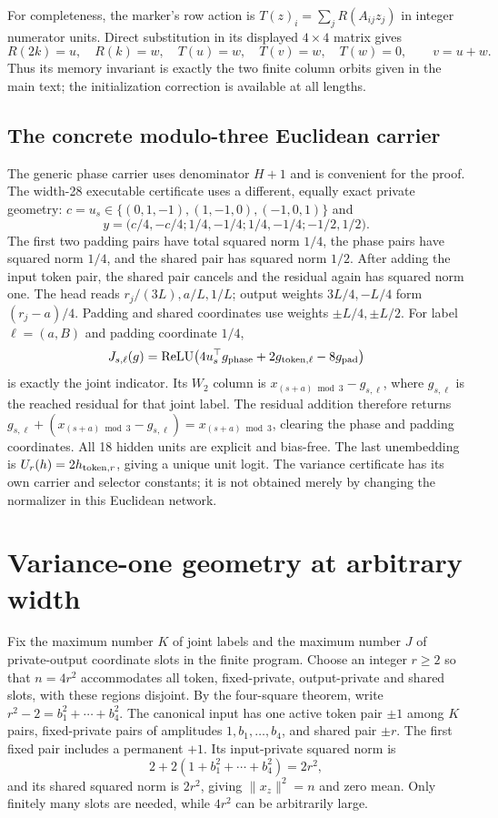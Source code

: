 \documentclass[10pt]{article}
\theoremstyle{remark}
\newcommand{\relu}{\operatorname{ReLU}}
\begin{document}
For completeness, the marker's row action is
$T(z)_i=\sum_jR(A_{ij}z_j)$ in integer numerator units. Direct substitution
in its displayed $4\times4$ matrix gives
\[
 R(2k)=u,\quad R(k)=w,\quad T(u)=w,\quad T(v)=w,\quad T(w)=0,
 \qquad v=u+w.
\]
Thus its memory invariant is exactly the two finite column orbits given in the
main text; the initialization correction is available at all lengths.

\subsection{The concrete modulo-three Euclidean carrier}
The generic phase carrier uses denominator $H+1$ and is convenient for the
proof. The width-28 executable certificate uses a different, equally exact
private geometry: $c=u_s\in\{(0,1,-1),(1,-1,0),(-1,0,1)\}$ and
\[
 y=\big(c/4,-c/4;1/4,-1/4;1/4,-1/4;-1/2,1/2\big).
\]
The first two padding pairs have total squared norm $1/4$, the phase pairs
have squared norm $1/4$, and the shared pair has squared norm $1/2$.
After adding the input token pair, the shared pair cancels and the residual
again has squared norm one. The head reads $r_j/(3L),a/L,1/L$; output weights
$3L/4,-L/4$ form $(r_j-a)/4$. Padding and shared coordinates use weights
$\pm L/4,\pm L/2$. For label $\ell=(a,B)$ and padding coordinate $1/4$,
\[
 J_{s,\ell}(g)=\relu\!\left(4u_s^\top g_{\rm phase}
             +2g_{{\rm token},\ell}-8g_{\rm pad}\right)
\]
is exactly the joint indicator. Its $W_2$ column is
$x_{(s+a)\bmod3}-g_{s,\ell}$, where $g_{s,\ell}$ is the reached residual for
that joint label. The residual addition therefore returns
$g_{s,\ell}+(x_{(s+a)\bmod3}-g_{s,\ell})=x_{(s+a)\bmod3}$,
clearing the phase and padding coordinates.
All 18 hidden units are explicit and bias-free. The last unembedding is
$U_r(h)=2h_{{\rm token},r}$, giving a unique unit logit.
The variance certificate has its own carrier and selector constants; it is
not obtained merely by changing the normalizer in this Euclidean network.

\section{Variance-one geometry at arbitrary width}\label{app:variance}
Fix the maximum number $K$ of joint labels and the maximum number $J$ of
private-output coordinate slots in the finite program. Choose an integer
$r\ge2$ so that $n=4r^2$ accommodates all token, fixed-private, output-private
and shared slots, with these regions disjoint. By the four-square theorem,
write $r^2-2=b_1^2+\cdots+b_4^2$. The canonical input has one active token pair
$\pm1$ among $K$ pairs, fixed-private pairs of amplitudes
$1,b_1,\ldots,b_4$, and shared pair $\pm r$. The first fixed pair includes a
permanent $+1$. Its input-private squared norm is
\[
 2+2(1+b_1^2+\cdots+b_4^2)=2r^2,
\]
and its shared squared norm is $2r^2$, giving $\|x_z\|^2=n$ and zero mean.
Only finitely many slots are needed, while $4r^2$ can be arbitrarily large.
\end{document}
